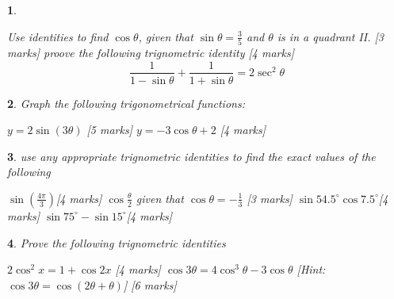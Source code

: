 \documentclass{article}
\theoremstyle{custom}
\newtheorem{question}{}
\begin{document}
\begin{question}
    \begin{tasks}
        \task Use identities to find $\cos{\theta}$, given that $\sin{\theta} = \frac{3}{5}$ and $\theta$ is in a quadrant II. \hfill[3 marks]
        \vspace{7 cm}
        \task proove the following trignometric identity \hfill[4 marks]
        \begin{equation}
            \frac{1}{1 - \sin{\theta}} + \frac{1}{1 + \sin{\theta}} = 2 \sec^2 \theta
        \end{equation}
        \vspace{7 cm}
    \end{tasks}
\end{question}

\begin{question}
    Graph the following trigonometrical functions:
    \begin{tasks}
        \task $y = 2 \sin{(3\theta)}$ \hfill[5 marks]
        \vspace{7 cm}
        \task $y = -3\cos{\theta} + 2$ \hfill[4 marks]
        \vspace{7 cm}
    \end{tasks}
\end{question}

\begin{question}
    use any appropriate trignometric identities to find the exact values of the following
    \begin{tasks}
        \task $\sin{(\frac{4\pi}{3})}$\hfill[4 marks]
        \vspace{7 cm}
        \task $\cos{\frac{\theta}{2}}$ given that $\cos\theta = -\frac{1}{3}$ \hfill[3 marks]
        \vspace{7 cm}
        \task $\sin 54.5^{\circ} \cos 7.5^{\circ}$\hfill[4 marks]
        \vspace{7 cm}
        \task $\sin 75^{\circ} -  \sin 15^{\circ}$\hfill[4 marks]
        \vspace{7 cm}
    \end{tasks}
\end{question}

\begin{question}
    Prove the following trignometric identities
    \begin{tasks}
        \task $2 \cos^{2} x = 1 + \cos {2x}$ \hfill[4 marks]
        \vspace{7 cm}
        \task $\cos{3\theta} = 4 \cos^3 \theta - 3 \cos\theta$  [Hint: $\cos{3\theta} = \cos{(2\theta + \theta)}$] \hfill[6 marks]
        \vspace{7 cm}
    \end{tasks}
\end{question}
\end{document}
